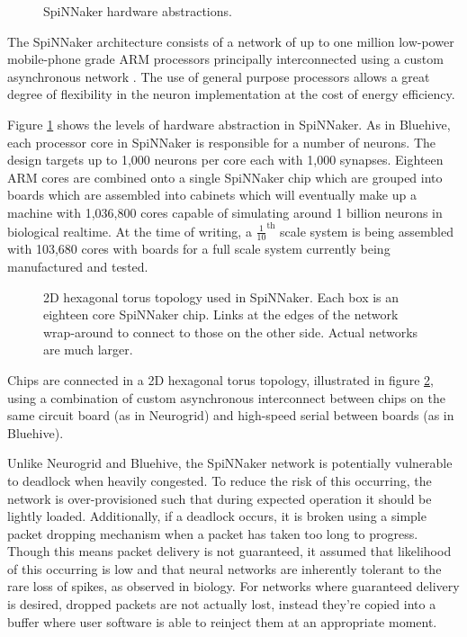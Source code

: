				\begin{figure}
					
					
					\caption{SpiNNaker hardware abstractions.}
					\label{fig:spinnaker-abstractions}
				\end{figure}
				
				The SpiNNaker architecture consists of a network of up to one million
				low-power mobile-phone grade ARM processors principally interconnected
				using a custom asynchronous network \cite{furber06}. The use of general
				purpose processors allows a great degree of flexibility in the neuron
				implementation at the cost of energy efficiency. 
				
				Figure \ref{fig:spinnaker-abstractions} shows the levels of hardware
				abstraction in SpiNNaker. As in Bluehive, each processor core in
				SpiNNaker is responsible for a number of neurons. The design targets up
				to 1,000 neurons per core each with 1,000 synapses. Eighteen ARM cores
				are combined onto a single SpiNNaker chip which are grouped into boards
				which are assembled into cabinets which will eventually make up a
				machine with 1,036,800 cores capable of simulating around 1 billion
				neurons in biological realtime.  At the time of writing, a
				$\frac{1}{10}^{\textrm{th}}$ scale system is being assembled with
				103,680 cores with boards for a full scale system currently being
				manufactured and tested.
				
				\begin{figure}
					\center
					
					
					\caption[2D hexagonal torus topology used in SpiNNaker.]{2D hexagonal
					torus topology used in SpiNNaker. Each box is an eighteen core
					SpiNNaker chip. Links at the edges of the network wrap-around to
					connect to those on the other side. Actual networks are much larger.}
					\label{fig:spinn-topology}
				\end{figure}
				
				Chips are connected in a 2D hexagonal torus topology, illustrated in
				figure \ref{fig:spinn-topology}, using a combination of custom
				asynchronous interconnect between chips on the same circuit board (as in
				Neurogrid) and high-speed serial between boards (as in Bluehive).
				
				Unlike Neurogrid and Bluehive, the SpiNNaker network is potentially
				vulnerable to deadlock when heavily congested. To reduce the risk of
				this occurring, the network is over-provisioned such that during
				expected operation it should be lightly loaded. Additionally, if a
				deadlock occurs, it is broken using a simple packet dropping mechanism
				when a packet has taken too long to progress. Though this means packet
				delivery is not guaranteed, it assumed that likelihood of this occurring
				is low and that neural networks are inherently tolerant to the rare loss
				of spikes, as observed in biology. For networks where guaranteed
				delivery is desired, dropped packets are not actually lost, instead
				they're copied into a buffer where user software is able to reinject
				them at an appropriate moment.
	
